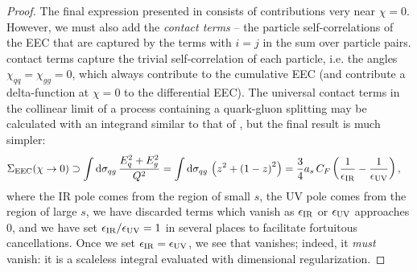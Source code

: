 \begin{proof}



The final expression presented in  consists of contributions very near \(\chi = 0\).
%
However, we must also add the \emph{contact terms} -- the particle self-correlations of the EEC that are captured by the terms with \(i=j\) in the sum over particle pairs.
%
contact terms capture the trivial self-correlation of each particle, i.e. the angles \(\chi_{qq} = \chi_{gg} = 0\), which always contribute to the cumulative EEC (and contribute a delta-function at \(\chi = 0\) to the differential EEC).
%
The universal contact terms in the collinear limit of a process containing a quark-gluon splitting may be calculated with an integrand similar to that of , but the final result is much simpler:
\begin{align}
    \label{eq:eec_contact}
    \Sigma_\text{EEC}(\chi \to 0)
    &\supset
    \int \dd\sigma_{qg} \,
        \frac{E_q^2 + E_g^2}{Q^2}
    =
    \int \dd\sigma_{qg} \,
    \le(z^2 + \le(1-z\ri)^2\ri)
    =
    \frac{3}{4}\ascf
    \le(\frac{1}{\epsir} - \frac{1}{\epsuv}\ri)
    ,
\end{align}
where the IR pole comes from the region of small \(s\), the UV pole comes from the region of large \(s\), we have discarded terms which vanish as \(\epsilon_\text{IR}\) or \(\epsilon_\text{UV}\) approaches 0, and we have set \(\epsilon_\text{IR}/\epsilon_\text{UV} = 1\) in several places to facilitate fortuitous cancellations.
%
Once we set \(\epsilon_\text{IR} = \epsilon_\text{UV}\), we see that  vanishes;
%
indeed, it \textit{must} vanish:
%
it is a scaleless integral evaluated with dimensional regularization.


\end{proof}
